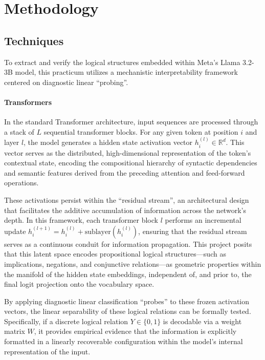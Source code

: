 \documentclass[12 pt]{article}  %
\begin{document}
\newpage
\section{Methodology}

\subsection{Techniques}
To extract and verify the logical structures embedded within Meta's Llama 3.2-3B 
model, this practicum utilizes a mechanistic interpretability framework centered 
on diagnostic linear ``probing''.

\paragraph{Transformers}
In the standard Transformer architecture, input sequences are processed through 
a stack of $L$ sequential transformer blocks. For any given token at position 
$i$ and layer $l$, the model generates a hidden state activation vector 
$h_i^{(l)} \in \mathbb{R}^d$. This vector serves as the distributed, 
high-dimensional representation of the token's contextual state, encoding the 
compositional hierarchy of syntactic dependencies and semantic features derived 
from the preceding attention and feed-forward operations.

These activations persist within the ``residual stream'', an architectural design 
that facilitates the additive accumulation of information across the network's 
depth. In this framework, each transformer block $l$ performs an incremental 
update $h_i^{(l+1)} = h_i^{(l)} + \text{sublayer}(h_i^{(l)})$, ensuring that 
the residual stream serves as a continuous conduit for information propagation. 
This project posits that this latent space encodes propositional logical 
structures—such as implications, negations, and conjunctive relations—as 
geometric properties within the manifold of the hidden state embeddings, 
independent of, and prior to, the final logit projection onto the vocabulary 
space.

By applying diagnostic linear classification ``probes'' to these frozen activation 
vectors, the linear separability of these logical relations can be formally 
tested. Specifically, if a discrete logical relation $Y \in \{0, 1\}$ is 
decodable via a weight matrix $W$, it provides empirical evidence that the 
information is explicitly formatted in a linearly recoverable configuration 
within the model's internal representation of the input.
\end{document}
